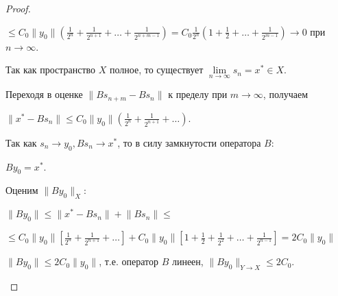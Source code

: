 \documentclass[12pt,a4paper,titlepage,oneside]{book}
\theoremstyle{definition}
\theoremstyle{plain}
\theoremstyle{remark}
\theoremstyle{remark}
\theoremstyle{remark}
\theoremstyle{remark}
\theoremstyle{plain}
\theoremstyle{plain}
\begin{document}
\begin{proof}
\begin{enumerate}
\begin{center}
$\leqslant C_0 \lVert y_0 \rVert (\frac{1}{2^n} + \frac{1}{2^{n+1}}+\ldots+\frac{1}{2^{n+m-1}})=C_0 \frac{1}{2^n} (1 + \frac{1}{2}+\ldots+\frac{1}{2^{m-1}}) \to 0$ при $n \to \infty$.
\end{center}

Так как пространство $X$ полное, то существует $\lim \limits_{n \to \infty} s_n=x^* \in X$.

Переходя в оценке $ \lVert B s_{n+m}-B s_n \rVert$ к пределу при $m \to \infty$, получаем

\begin{center}
$ \lVert x^*-B s_n \rVert \leqslant C_0 \lVert y_0\rVert (\frac{1}{2^n} + \frac{1}{2^{n+1}}+\ldots)$.
\end{center}

Так как $s_n \to y_0, B s_n \to x^*$, то в силу замкнутости оператора $B$: 

\begin{center}
$B y_0=x^* $.
\end{center}

Оценим $\lVert B y_0 \rVert _X$:

\begin{center}
$\lVert B y_0 \rVert \leqslant \lVert x^* - B s_n \rVert + \lVert B s_n \rVert \leqslant$ 
\end{center}

\begin{center}
$\leqslant C_0 \lVert y_0\rVert [\frac{1}{2^n} + \frac{1}{2^{n+1}}+\ldots] + C_0 \lVert y_0\rVert [1+\frac{1}{2} +\frac{1}{2^2}+ \ldots+\frac{1}{2^{n-1}}]= 2 C_0 \lVert y_0\rVert$
\end{center}

$\lVert B y_0 \rVert \leqslant 2 C_0 \lVert y_0\rVert$, т.е. оператор $B$ линеен, $ \lVert B y_0 \rVert _{Y \to X} \leqslant 2 C_0$.
\qedhere
\end{enumerate}
\end{proof}
\end{document}
